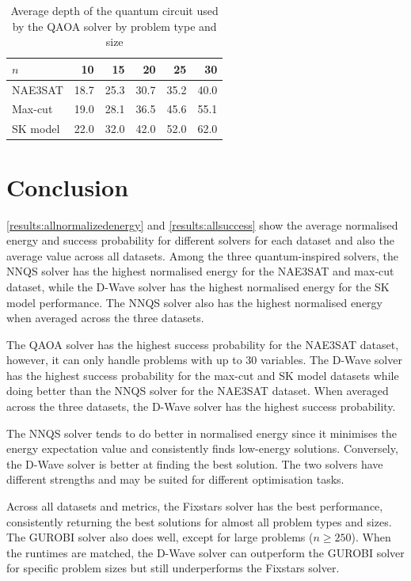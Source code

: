 \begin{table}[!htb]
    \centering
    \caption{Average depth of the quantum circuit used by the QAOA solver by problem type and size}
    \label{table:depth}
    \begin{tabular}{lrrrrr} \toprule
        $n$ & 10 & 15 & 20 & 25 & 30\\ \midrule
        NAE3SAT & 18.7 & 25.3 & 30.7 & 35.2 & 40.0 \\
        Max-cut & 19.0 & 28.1 & 36.5 & 45.6 & 55.1 \\
        SK model & 22.0 & 32.0 & 42.0 & 52.0 & 62.0\\ \bottomrule
    \end{tabular}
\end{table}

\section{Conclusion}
\autoref{results:allnormalizedenergy} and \autoref{results:allsuccess} show the average normalised energy and success probability for different solvers for each dataset and also the average value across all datasets. Among the three quantum-inspired solvers, the NNQS solver has the highest normalised energy for the NAE3SAT and max-cut dataset, while the D-Wave solver has the highest normalised energy for the SK model performance. The NNQS solver also has the highest normalised energy when averaged across the three datasets. 

The QAOA solver has the highest success probability for the NAE3SAT dataset, however, it can only handle problems with up to $30$ variables. The D-Wave solver has the highest success probability for the max-cut and SK model datasets while doing better than the NNQS solver for the NAE3SAT dataset. When averaged across the three datasets, the D-Wave solver has the highest success probability.

The NNQS solver tends to do better in normalised energy since it minimises the energy expectation value and consistently finds low-energy solutions. Conversely, the D-Wave solver is better at finding the best solution. The two solvers have different strengths and may be suited for different optimisation tasks.

Across all datasets and metrics, the Fixstars solver has the best performance, consistently returning the best solutions for almost all problem types and sizes. The GUROBI solver also does well, except for large problems ($n\geq 250$). When the runtimes are matched, the D-Wave solver can outperform the GUROBI solver for specific problem sizes but still underperforms the Fixstars solver. 

